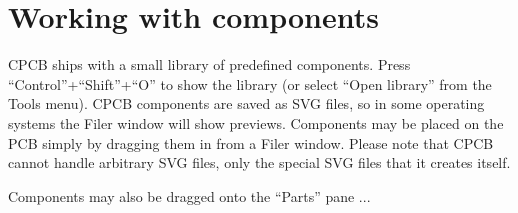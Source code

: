 \documentclass[11pt]{report}
\begin{document}
\section{Working with components}
CPCB ships with a small library of predefined components. Press
``Control''+``Shift''+``O'' to show the library (or select ``Open
library'' from the Tools menu). CPCB components are saved as SVG
files, so in some operating systems the Filer window will show
previews. Components may be placed on the PCB simply by dragging them
in from a Filer window. Please note that CPCB cannot handle arbitrary
SVG files, only the special SVG files that it creates itself.

Components may also be dragged onto the ``Parts'' pane ...
\end{document}
